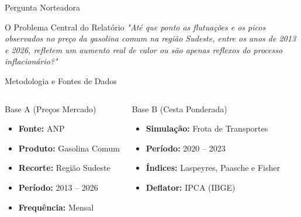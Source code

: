\documentclass{beamer}
\begin{document}
\begin{frame}{Pergunta Norteadora}
\begin{block}{O Problema Central do Relatório}
    \vspace{0.2cm}
    \centering
    \large\itshape
    "Até que ponto as flutuações e os picos observados no preço da gasolina comum na região Sudeste, entre os anos de 2013 e 2026, refletem um aumento real de valor ou são apenas reflexos do processo inflacionário?"
    \vspace{0.2cm}
\end{block}
\end{frame}
\begin{frame}{Metodologia e Fontes de Dados}
\begin{columns}
    \begin{block}{Base A (Preços Mercado)}
        \begin{itemize}
            \item \textbf{Fonte:} ANP
            \item \textbf{Produto:} Gasolina Comum
            \item \textbf{Recorte:} Região Sudeste
            \item \textbf{Período:} 2013 -- 2026
            \item \textbf{Frequência:} Mensal
        \end{itemize}
    \end{block}

    \begin{block}{Base B (Cesta Ponderada)}
        \begin{itemize}
            \item \textbf{Simulação:} Frota de Transportes
            \item \textbf{Período:} 2020 -- 2023
            \item \textbf{Índices:} Laspeyres, Paasche e Fisher
            \item \textbf{Deflator:} IPCA (IBGE)
        \end{itemize}
    \end{block}
\end{columns}
\end{frame}
\end{document}
